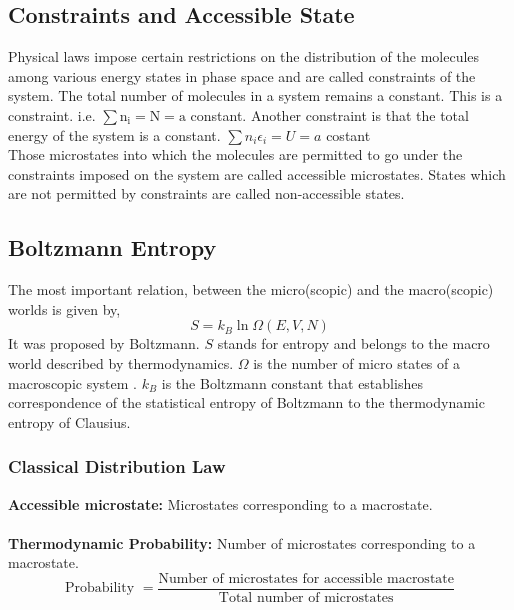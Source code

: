 \subsection{Constraints and Accessible State}
Physical laws impose certain restrictions on the distribution of the molecules among various energy states in phase space and are called constraints of the system. The total number of molecules in a system remains a constant. This is a constraint. i.e. $\sum \mathrm{n}_{\mathrm{i}}=\mathrm{N}=\mathrm{a}$ constant. Another constraint is that the total energy of the system is a constant. $\sum n_{i} \epsilon_{i}=U=a$ costant\\
 Those microstates into which the molecules are permitted to go under the constraints imposed on the system are called accessible microstates. States which are not permitted by constraints are called non-accessible states.
 \subsection{Boltzmann Entropy}
 The most important relation, between the micro(scopic) and the macro(scopic) worlds is given by,
\begin{equation}
 S=k_{B} \ln {\Omega}(E, V, N)
\end{equation}
 It was proposed by Boltzmann. $ S$ stands for entropy and belongs to the macro world described by thermodynamics. ${\Omega}$ is the number of micro states of a macroscopic system . $ k_{B}$ is the Boltzmann constant  that establishes correspondence of the statistical entropy of Boltzmann to the thermodynamic entropy of Clausius.
 \subsubsection{ Classical Distribution Law }
 \textbf{Accessible microstate\qquad \quad : } Microstates corresponding to a macrostate.\\\\
 \textbf{Thermodynamic Probability: } Number of microstates corresponding to a macrostate.
 \begin{equation}
 \text{Probability }=\frac{\text{Number of microstates for accessible macrostate}}{\text{Total number of microstates}}
 \end{equation}

